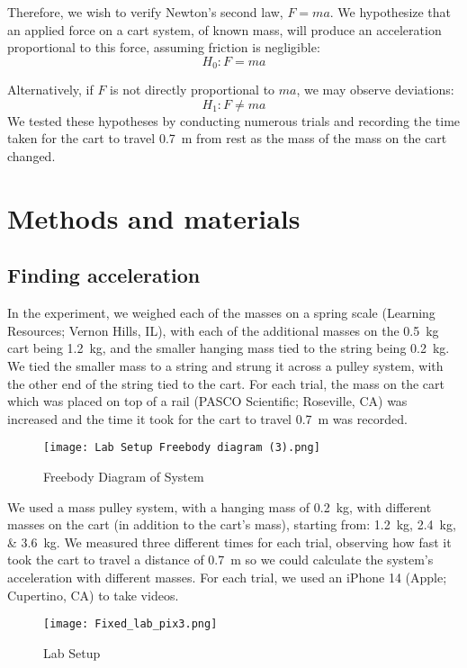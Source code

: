 \documentclass[reprint,amsmath,amssymb,aps]{revtex4-2}
\begin{document}
Therefore, we wish to verify Newton's second law, $F = ma$. We hypothesize that an applied force on a cart system, of known mass, will produce an acceleration proportional to this force, assuming friction is negligible:
\begin{equation} 
H_0: F = ma 
\label{eq:2}
\end{equation}

Alternatively, if $F$ is not directly proportional to $ma$, we may observe deviations:
\begin{equation} 
H_1: F \neq ma
\label{eq:3}
\end{equation}
We tested these hypotheses by conducting numerous trials and recording the time taken for the cart to travel \qty{0.7}{\meter} from rest as the mass of the mass on the cart changed.







\section{Methods and materials}

\subsection{Finding acceleration}
In the experiment, we weighed each of the masses on a spring scale (Learning Resources; Vernon Hills, IL), with each of the additional masses on the \qty{0.5}{\kilo\gram} cart being \qty{1.2}{\kilo\gram}, and the smaller hanging mass tied to the string being \qty{0.2}{\kilo\gram}. We tied the smaller mass to a string and strung it across a pulley system, with the other end of the string tied to the cart. For each trial, the mass on the cart which was placed on top of a rail (PASCO Scientific; Roseville, CA) was increased and the time it took for the cart to travel \qty{0.7}{\meter} was recorded.
\begin{figure} %
\centering
\texttt{[image: Lab Setup Freebody diagram (3).png]}
\caption{Freebody Diagram of System}
\label{fig:enter-label}
\end{figure}


We used a mass pulley system, with a hanging mass of \qty{0.2}{\kilo\gram}, with different masses on the cart (in addition to the cart's mass), starting from: \qtylist{1.2;2.4;3.6}{\kilo\gram}. We measured three different times for each trial, observing how fast it took the cart to travel a distance of \qty{0.7}{\meter} so we could calculate the system's acceleration with different masses. For each trial, we used an iPhone 14 (Apple; Cupertino, CA) to take videos.
\begin{figure} %
\centering
\texttt{[image: Fixed\_lab\_pix3.png]}
\caption{Lab Setup}
\label{fig:lab_setup}
\end{figure} 
\end{document}
